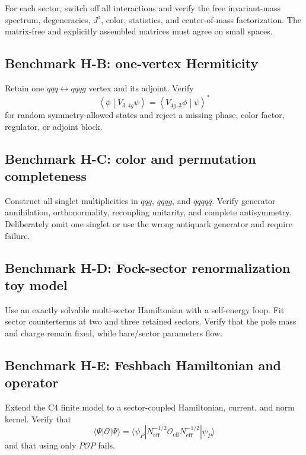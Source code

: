 \documentclass[11pt]{article}
\newcommand{\cO}{\mathcal O}
\newcommand{\inner}[2]{\left\langle #1\middle|#2\right\rangle}
\newcommand{\eff}{\mathrm{eff}}
\newcommand{\Jz}{J^z}
\begin{document}
For each sector, switch off all interactions and verify the free invariant-mass
spectrum, degeneracies, \(\Jz\), color, statistics, and center-of-mass
factorization.  The matrix-free and explicitly assembled matrices must agree on
small spaces.

\subsection{Benchmark H-B: one-vertex Hermiticity}

Retain one \(qqq\leftrightarrow qqqg\) vertex and its adjoint.  Verify
\begin{equation}
 \inner{\phi}{V_{3,4g}\psi}
 =\inner{V_{4g,3}\phi}{\psi}^{*}
 \label{eq:vertex-hermiticity-benchmark}
\end{equation}
for random symmetry-allowed states and reject a missing phase, color factor,
regulator, or adjoint block.

\subsection{Benchmark H-C: color and permutation completeness}

Construct all singlet multiplicities in \(qqq\), \(qqqg\), and
\(qqqq\bar q\).  Verify generator annihilation, orthonormality, recoupling
unitarity, and complete antisymmetry.  Deliberately omit one singlet or use the
wrong antiquark generator and require failure.

\subsection{Benchmark H-D: Fock-sector renormalization toy model}

Use an exactly solvable multi-sector Hamiltonian with a self-energy loop.  Fit
sector counterterms at two and three retained sectors.  Verify that the pole
mass and charge remain fixed, while bare/sector parameters flow.

\subsection{Benchmark H-E: Feshbach Hamiltonian and operator}

Extend the C4 finite model to a sector-coupled Hamiltonian, current, and norm
kernel.  Verify that
\begin{equation}
 \langle\Psi|\cO|\Psi\rangle
 =\langle\psi_P|N_{\eff}^{-1/2}\cO_{\eff}N_{\eff}^{-1/2}|\psi_P\rangle
 \label{eq:feshbach-benchmark}
\end{equation}
and that using only \(P\cO P\) fails.
\end{document}
